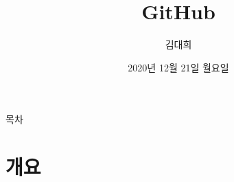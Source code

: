 \documentclass[aspectratio=1610,20pt,xcolor=pdftex,dvipsnames,table,handout]{beamer}
\begin{document}
	

			\title{ GitHub }
			\author{ 김대희 }
			\date{ 
					2020년 
					12월 
					21일
					월요일  
					} 


%


		\begin{frame}[plain]
		\titlepage
		\end{frame}


		\begin{frame} [plain]{목차}
		\tableofcontents%

%
%
		\end{frame}


		\begin{frame} [t,plain]
		\frametitle{}
		\end{frame}			

		\begin{frame} [t,plain]
		\frametitle{}
		\end{frame}			
					



		\part{개요 }
		\frame{\partpage}
\end{document}

